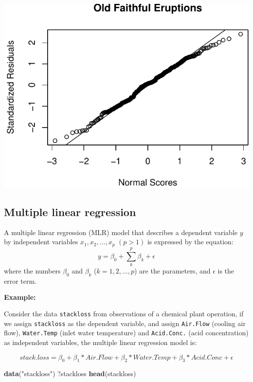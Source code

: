 \documentclass[]{article}
\newenvironment{Shaded}{\begin{snugshade}}{\end{snugshade}}
\newcommand{\KeywordTok}[1]{\textcolor[rgb]{0.13,0.29,0.53}{\textbf{{#1}}}}
\newcommand{\StringTok}[1]{\textcolor[rgb]{0.31,0.60,0.02}{{#1}}}
\newcommand{\NormalTok}[1]{{#1}}
\numberwithin{equation}{section}
\begin{document}
\includegraphics{index_files/figure-latex/unnamed-chunk-204-1.pdf}

\subsection{Multiple linear
regression}\label{multiple-linear-regression}

A multiple linear regression (MLR) model that describes a dependent
variable \(y\) by independent variables \(x_1, x_2, ..., x_p\)
\((p > 1)\) is expressed by the equation: \[
    y  = \beta_0 + \sum_{k}^{p} \beta_k + \epsilon
\] where the numbers \(\beta_0\) and \(\beta_k\) (\(k = 1, 2, ..., p\))
are the parameters, and \(\epsilon\) is the error term.

\textbf{Example:}

Consider the data \texttt{stackloss} from observations of a chemical
plant operation, if we assign \texttt{stackloss} as the dependent
variable, and assign \texttt{Air.Flow} (cooling air flow),
\texttt{Water.Temp} (inlet water temperature) and \texttt{Acid.Conc.}
(acid concentration) as independent variables, the multiple linear
regression model is:

\[
      stack.loss = \beta_0 + \beta_1 * Air.Flow + \beta_2 * Water.Temp + \beta_3 * Acid.Conc + \epsilon
\]

\begin{Shaded}
\begin{Highlighting}[]
\KeywordTok{data}\NormalTok{(}\StringTok{"stackloss"}\NormalTok{)}
\NormalTok{?stackloss}
\KeywordTok{head}\NormalTok{(stackloss)}
\end{Highlighting}
\end{Shaded}
\end{document}
